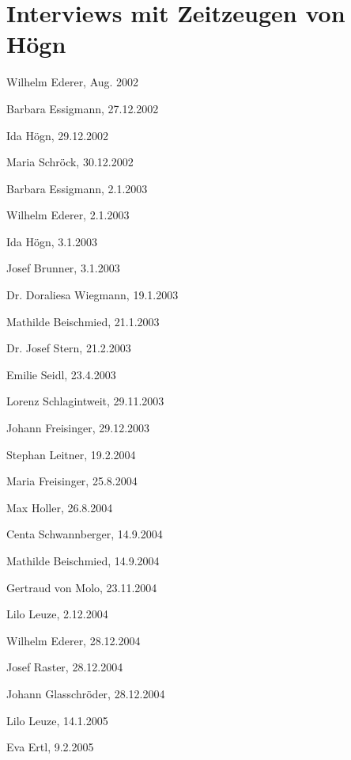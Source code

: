 \section{Interviews mit Zeitzeugen von Högn}

\begin{multicols}{2}
\begin{compactitem}
\raggedright
\item Wilhelm Ederer, Aug. 2002
\item Barbara Essigmann, 27.12.2002
\item Ida Högn, 29.12.2002
\item Maria Schröck, 30.12.2002
\item Barbara Essigmann, 2.1.2003
\item Wilhelm Ederer, 2.1.2003
\item Ida Högn, 3.1.2003
\item Josef Brunner, 3.1.2003
\item Dr. Doraliesa Wiegmann, 19.1.2003
\item Mathilde Beischmied, 21.1.2003
\item Dr. Josef Stern, 21.2.2003
\item Emilie Seidl, 23.4.2003
\item Lorenz Schlagintweit, 29.11.2003
\item Johann Freisinger, 29.12.2003
\item Stephan Leitner, 19.2.2004
\item Maria Freisinger, 25.8.2004
\item Max Holler, 26.8.2004
\item Centa Schwannberger, 14.9.2004
\item Mathilde Beischmied, 14.9.2004
\item Gertraud von Molo, 23.11.2004
\item Lilo Leuze, 2.12.2004
\item Wilhelm Ederer, 28.12.2004
\item Josef Raster, 28.12.2004
\item Johann Glasschröder, 28.12.2004
\item Lilo Leuze, 14.1.2005
\item Eva Ertl, 9.2.2005
\end{compactitem}
\end{multicols}
